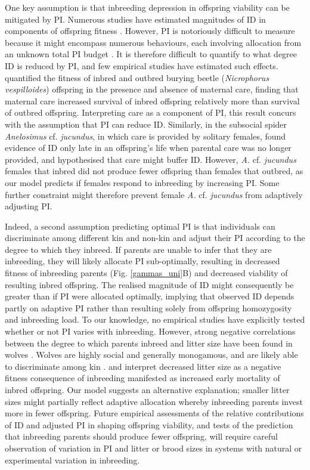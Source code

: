 \documentclass[10pt,letterpaper]{article}
\begin{document}
One key assumption is that inbreeding depression in offspring viability can be mitigated by PI. Numerous studies have estimated magnitudes of ID in components of offspring fitness \cite[][]{Keller2002, Charlesworth2009, Szulkin2012}. However, PI is notoriously difficult to measure because it might encompass numerous behaviours, each involving allocation from an unknown total PI budget \cite[][]{Parker2002}. It is therefore difficult to quantify to what degree ID is reduced by PI, and few empirical studies have estimated such effects. \cite{Pilakouta2015} quantified the fitness of inbred and outbred burying beetle (\textit{Nicrophorus vespilloides}) offspring in the presence and absence of maternal care, finding that maternal care increased survival of inbred offspring relatively more than survival of outbred offspring. Interpreting care as a component of PI, this result concurs with the assumption that PI can reduce ID. Similarly, in the subsocial spider \textit{Anelosimus} cf. \textit{jucundus}, in which care is provided by solitary females, \cite{Aviles2006} found evidence of ID only late in an offspring's life when parental care was no longer provided, and hypothesised that care might buffer ID. However, \textit{A.} cf. \textit{jucundus} females that inbred did not produce fewer offspring than females that outbred, as our model predicts if females respond to inbreeding by increasing PI. Some further constraint might therefore prevent female \textit{A.} cf. \textit{jucundus} from adaptively adjusting PI.

Indeed, a second assumption predicting optimal PI is that individuals can discriminate among different kin and non-kin and adjust their PI according to the degree to which they inbreed. If parents are unable to infer that they are inbreeding, they will likely allocate PI sub-optimally, resulting in decreased fitness of inbreeding parents (Fig. \ref{gammas_uni}B) and decreased viability of resulting inbred offspring. The realised magnitude of ID might consequently be greater than if PI were allocated optimally, implying that observed ID depends partly on adaptive PI rather than resulting solely from offspring homozygosity and inbreeding load. To our knowledge, no empirical studies have explicitly tested whether or not PI varies with inbreeding. However, strong negative correlations between the degree to which parents inbreed and litter size have been found in wolves \cite[\textit{Canis lupus};][]{Liberg2005, Fredrickson2007}. Wolves are highly social and generally monogamous, and are likely able to discriminate among kin \cite[][]{Raikkonen2009, Geffen2011}. \cite{Liberg2005} and \cite{Fredrickson2007} interpret decreased litter size as a negative fitness consequence of inbreeding manifested as increased early mortality of inbred offspring. Our model suggests an alternative explanation; smaller litter sizes might partially reflect adaptive allocation whereby inbreeding parents invest more in fewer offspring. Future empirical assessments of the relative contributions of ID and adjusted PI in shaping offspring viability, and tests of the prediction that inbreeding parents should produce fewer offspring, will require careful observation of variation in PI and litter or brood sizes in systems with natural or experimental variation in inbreeding.
\end{document}
